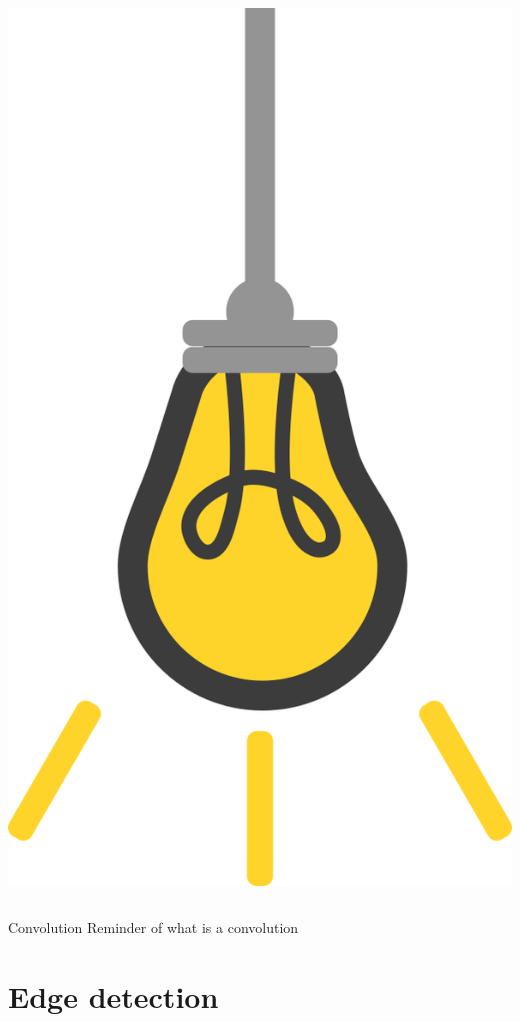 \documentclass[9pt, aspectratio=169]{beamer}
\begin{document}
\begin{frame}
\begin{columns}
\begin{column}{0.2\textwidth}
            \includegraphics[angle=-30, origin=tr, width=1.5\textwidth]{lightbulb.png}
        \end{column}
    \end{columns}
\end{frame}

\begin{frame}
    {Convolution}
    Reminder of what is a convolution
\end{frame}

\section{Edge detection}
\end{document}

